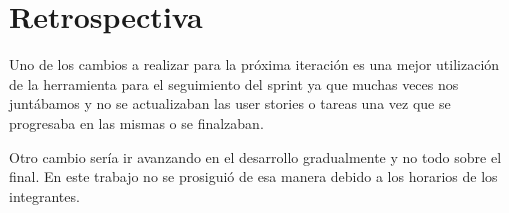\section{Retrospectiva}

Uno de los cambios a realizar para la próxima iteración es una mejor utilización
de la herramienta para el seguimiento del sprint ya que muchas veces nos juntábamos
y no se actualizaban las user stories o tareas una vez que se progresaba en las mismas o se 
finalzaban.


Otro cambio sería ir avanzando en el desarrollo gradualmente y no todo sobre el final. 
En este trabajo no se prosiguió de esa manera debido a los horarios de los integrantes.



